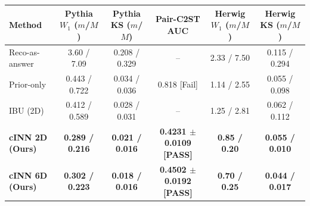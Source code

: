 \begin{table}[htbp]
\centering
\footnotesize
\begin{tabular}{lccccc}
\toprule
\textbf{Method} & \textbf{Pythia $W_1$ ($m$/$M$)} & \textbf{Pythia KS ($m$/$M$)} & \textbf{Pair-C2ST AUC} & \textbf{Herwig $W_1$ ($m$/$M$)} & \textbf{Herwig KS ($m$/$M$)} \\
\midrule
Reco-as-answer & 3.60 / 7.09 & 0.208 / 0.329 & -- & 2.33 / 7.50 & 0.115 / 0.294 \\
Prior-only & 0.443 / 0.722 & 0.034 / 0.036 & 0.818 [Fail] & 1.14 / 2.55 & 0.055 / 0.098 \\
IBU (2D) & 0.412 / 0.589 & 0.028 / 0.031 & -- & 1.25 / 2.81 & 0.062 / 0.112 \\
\textbf{cINN 2D (Ours)} & \textbf{0.289 / 0.216} & \textbf{0.021 / 0.016} & \textbf{0.4231 $\pm$ 0.0109 [PASS]} & \textbf{0.85 / 0.20} & \textbf{0.055 / 0.010} \\
\textbf{cINN 6D (Ours)} & \textbf{0.302 / 0.223} & \textbf{0.018 / 0.016} & \textbf{0.4502 $\pm$ 0.0192 [PASS]} & \textbf{0.70 / 0.25} & \textbf{0.044 / 0.017} \\
\bottomrule
\end{tabular}
\end{table}
